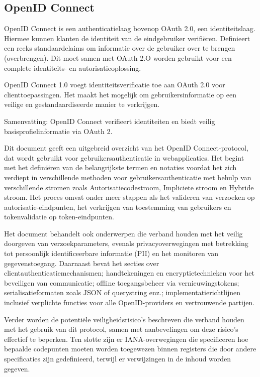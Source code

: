\subsection{OpenID Connect}%
\label{subsec:openid-connect}
OpenID Connect is een authenticatielaag bovenop OAuth 2.0, een identiteitslaag. Hiermee kunnen klanten de identiteit van de eindgebruiker verifiëren. Definieert een reeks standaardclaims om informatie over de gebruiker over te brengen (overbrengen). Dit moet samen met OAuth 2.O worden gebruikt voor een complete identiteits- en autorisatieoplossing.

OpenID Connect 1.0 voegt identiteitsverificatie toe aan OAuth 2.0 voor clienttoepassingen.
Het maakt het mogelijk om gebruikersinformatie op een veilige en gestandaardiseerde manier te verkrijgen.

Samenvatting: OpenID Connect verifieert identiteiten en biedt veilig basisprofielinformatie via OAuth 2.

Dit document \autocite{Sakimura2014} geeft een uitgebreid overzicht van het OpenID Connect-protocol, dat wordt gebruikt voor gebruikersauthenticatie in webapplicaties. Het begint met het definiëren van de belangrijkste termen en notaties voordat het zich verdiept in verschillende methoden voor gebruikersauthenticatie met behulp van verschillende stromen zoals Autorisatiecodestroom, Impliciete stroom en Hybride stroom. Het proces omvat onder meer stappen als het valideren van verzoeken op autorisatie-eindpunten, het verkrijgen van toestemming van gebruikers en tokenvalidatie op token-eindpunten.

Het document behandelt ook onderwerpen die verband houden met het veilig doorgeven van verzoekparameters, evenals privacyoverwegingen met betrekking tot persoonlijk identificeerbare informatie (PII) en het monitoren van gegevenstoegang. Daarnaast bevat het secties over clientauthenticatiemechanismen; handtekeningen en encryptietechnieken voor het beveiligen van communicatie; offline toegangsbeheer via vernieuwingstokens; serialisatieformaten zoals JSON of querystring enz.; implementatierichtlijnen inclusief verplichte functies voor alle OpenID-providers en vertrouwende partijen.

Verder worden de potentiële veiligheidsrisico's beschreven die verband houden met het gebruik van dit protocol, samen met aanbevelingen om deze risico's effectief te beperken. Ten slotte zijn er IANA-overwegingen die specificeren hoe bepaalde codepunten moeten worden toegewezen binnen registers die door andere specificaties zijn gedefinieerd, terwijl er verwijzingen in de inhoud worden gegeven.

